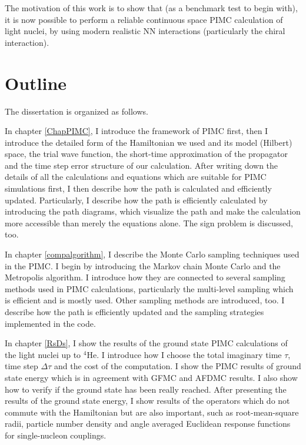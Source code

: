 \documentclass[12pt,letterpaper,UTF8]{report}
\begin{document}
The motivation of this work is to show that (as a benchmark test to begin with),
it is now possible to perform a reliable continuous space PIMC calculation of light nuclei, by using modern realistic NN interactions (particularly the chiral interaction).




\section{Outline}

The dissertation is organized as follows.

In chapter \ref{ChapPIMC}, I introduce the framework of PIMC first,
then I introduce the detailed form of the Hamiltonian we used and its model (Hilbert) space, the trial wave function, the short-time approximation of the propagator and the time step error structure of our calculation.
After writing down the details of all the calculations and equations which are suitable for PIMC simulations first, I then describe how the path is calculated and efficiently updated. Particularly, I describe how the path is efficiently calculated by introducing the path diagrams, which visualize the path and make the calculation more accessible than merely the equations alone.
The sign problem is discussed, too.

In chapter \ref{compalgorithm}, I describe the Monte Carlo sampling techniques used in the PIMC.
I begin by introducing the Markov chain Monte Carlo and the Metropolis algorithm. I introduce how they are connected to several sampling methods used in PIMC calculations, particularly the multi-level sampling which is efficient and is mostly used. Other sampling methods are introduced, too. I describe how the path is efficiently updated and the sampling strategies implemented in the code.

In chapter \ref{RsDs}, I show the results of the ground state PIMC calculations of the light nuclei up to $^4$He.
I introduce how I choose the total imaginary time $\tau$, time step $\Delta \tau$ and the cost of the computation. I show the PIMC results of ground state energy which is in agreement with GFMC and AFDMC results. I also show how to verify if the ground state has been really reached.
After presenting the results of the ground state energy, I show results of the operators which do not commute with the Hamiltonian but are also important, such as root-mean-square radii, particle number density and angle averaged Euclidean response functions for single-nucleon couplings.
\end{document}
